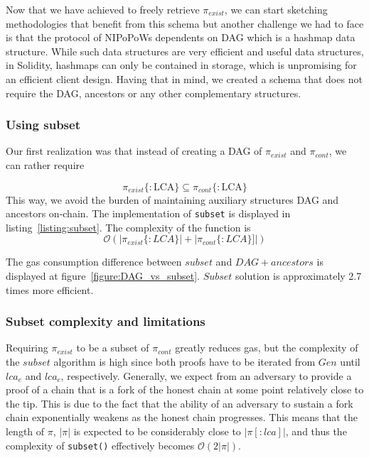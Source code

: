 Now that we have achieved to freely retrieve $\pi_{exist}$, we can start
sketching methodologies that benefit from this schema but another challenge we
had to face is that the protocol of NIPoPoWs dependents on DAG which is a
hashmap data structure. While such data structures are very efficient and
useful data structures, in Solidity, hashmaps can only be contained in storage,
which is unpromising for an efficient client design. Having that in mind, we
created a schema that does not require the DAG, ancestors or any other
complementary structures.


\subsubsection{Using subset}

Our first realization was that instead of creating a DAG of $\pi_{exist}$ and
$\pi_{cont}$, we can rather require

\[ \pi_{exist}\{:\textrm{LCA}\} \subseteq \pi_{cont}\{:\textrm{LCA}\} \]
This way, we avoid the burden of maintaining auxiliary structures DAG and
ancestors on-chain. The implementation of \texttt{subset} is displayed in
listing~\ref{listing:subset}. The complexity of the function is \[
\mathcal{O}(|\pi_{exist}\{:LCA\}| + |\pi_{cont}\{:LCA\}]|) \]





The gas consumption difference between $subset$ and $DAG+ancestors$ is
displayed at figure~\ref{figure:DAG_vs_subset}. $Subset$ solution is
approximately 2.7 times more efficient.



\subsubsection{Subset complexity and limitations}

Requiring $\pi_{exist}$ to be a subset of $\pi_{cont}$ greatly reduces gas, but
the complexity of the $subset$ algorithm is high since both proofs have to be
iterated from $Gen$ until $lca_e$ and $lca_c$, respectively. Generally, we
expect from an adversary to provide a proof of a chain that is a fork of the
honest chain at some point relatively close to the tip. This is due to the fact
that the ability of an adversary to sustain a fork chain exponentially weakens
as the honest chain progresses. This means that the length of $\pi$, $|\pi|$ is
expected to be considerably close to $|\pi[:lca]|$, and thus the complexity of
\texttt{subset()} effectively becomes $\mathcal{O}(2|\pi|)$.

